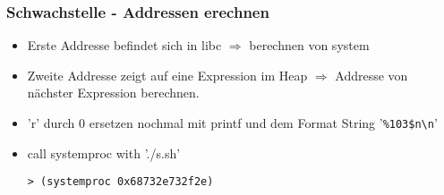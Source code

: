 \begin{frame}[fragile]
    \frametitle{Schwachstelle - Addressen erechnen}
\begin{itemize}
\item Erste Addresse befindet sich in libc $\Rightarrow$ berechnen von system
\item Zweite Addresse zeigt auf eine Expression im Heap $\Rightarrow$ Addresse von nächster Expression berechnen.
\end{itemize}

\begin{itemize}
\item 'r' durch 0 ersetzen nochmal mit printf und dem Format String '\texttt{\%103\$n\textbackslash n}'
\item call systemproc with './s.sh'
\begin{lstlisting}
> (systemproc 0x68732e732f2e)
\end{lstlisting}
\end{itemize}
\end{frame}

